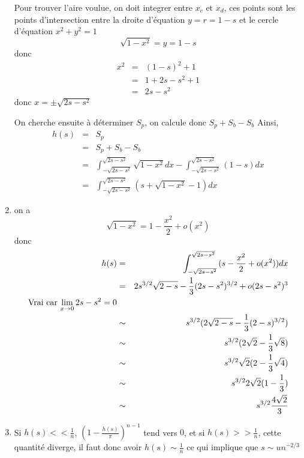 \documentclass[a4paper,12pt,twoside]{article}
\begin{document}
\begin{enumerate}
			Pour trouver l'aire voulue, on doit integrer entre $x_c$ et $x_d$, ces points sont les points d'intersection entre la droite d'équation $y = r = 1 - s$ et le cercle d'équation $x^2 + y^2 = 1$
			$$ \sqrt{1 - x^2} = y = 1 - s $$ donc 
			\begin{eqnarray}
				x^2	&=& (1 - s)^2 + 1\\
					&=& 1 + 2s - s^2 + 1\\
					&=& 2s - s^2
			\end{eqnarray} 
			donc $x = \pm \sqrt{2s - s^2}$

			On cherche ensuite à déterminer $S_p$, on calcule donc $S_p + S_b - S_b$
			Ainsi, \begin{eqnarray}
				h(s)	&=& S_p \\
					&=& S_p + S_b - S_b \\
					&=& \int^{\sqrt{2s - s^2}}_{-\sqrt{2s - s^2}}{\sqrt{1-x^2}dx} - \int^{\sqrt{2s - s^2}}_{-\sqrt{2s - s^2}}{(1 - s) dx} \\
					&=& \int^{\sqrt{2s - s^2}}_{-\sqrt{2s - s^2}}{(s + \sqrt{1-x^2} - 1) dx}
			\end{eqnarray}

		\item on a $$\sqrt{1 - x^2} = 1 - \frac{x^2}{2} + o(x^2)$$
		donc
		\begin{eqnarray}
			h(s)	&=& \int^{\sqrt{2s - s^2}}_{-\sqrt{2s - s^2}}{(s - \frac{x^2}{2} + o(x^2)) dx} \\
				&=& 2s^{3/2}\sqrt{2-s} - \frac{1}{3}(2s - s^2)^{3/2} + o(2s-s^2)^3 \\\text{Vrai car $ \lim_{x \to 0} 2s - s^2 = 0$}\\ %
				&\sim& s^{3/2} (2\sqrt{2-s} - \frac{1}{3}(2 - s)^{3/2}) \\
				&\sim& s^{3/2} (2\sqrt{2} - \frac{1}{3}\sqrt{8}) \\
				&\sim& s^{3/2} \sqrt{2}(2 - \frac{1}{3}\sqrt{4}) \\
				&\sim& s^{3/2} 2\sqrt{2}(1 - \frac{1}{3}) \\
				&\sim& s^{3/2} \frac{4\sqrt{2}}{3} \\
		\end{eqnarray}
		\item	Si $h(s) << \frac{1}{n}$, $\left(1 - \frac{h(s)}{\pi}\right)^{n-1}$ tend vers $0$, et si $h(s) >> \frac{1}{n}$, cette quantité diverge, il faut donc avoir $h(s) \sim \frac{1}{n}$ ce qui implique que $s \sim un^{-2/3}$%


\end{enumerate}
\end{document}
